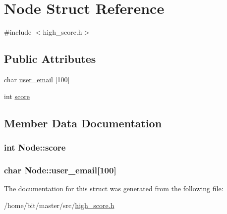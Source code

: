 \hypertarget{structNode}{\section{Node Struct Reference}
\label{structNode}
}


{\ttfamily \#include $<$high\-\_\-score.\-h$>$}

\subsection*{Public Attributes}
\begin{DoxyCompactItemize}
\item 
char \hyperlink{structNode_a1445d7aa5cb20881c19a8cb391cab2ba}{user\-\_\-email} \mbox{[}100\mbox{]}
\item 
int \hyperlink{structNode_abde8063e14755d579f1253a883b29044}{score}
\end{DoxyCompactItemize}


\subsection{Member Data Documentation}
\hypertarget{structNode_abde8063e14755d579f1253a883b29044}{
\subsubsection[{score}]{\setlength{\rightskip}{0pt plus 5cm}int Node\-::score}}\label{structNode_abde8063e14755d579f1253a883b29044}
\hypertarget{structNode_a1445d7aa5cb20881c19a8cb391cab2ba}{
\subsubsection[{user\-\_\-email}]{\setlength{\rightskip}{0pt plus 5cm}char Node\-::user\-\_\-email\mbox{[}100\mbox{]}}}\label{structNode_a1445d7aa5cb20881c19a8cb391cab2ba}


The documentation for this struct was generated from the following file\-:\begin{DoxyCompactItemize}
\item 
/home/bit/master/src/\hyperlink{high__score_8h}{high\-\_\-score.\-h}\end{DoxyCompactItemize}
